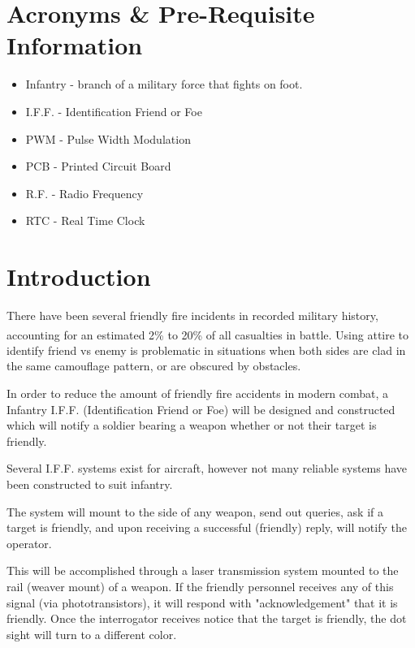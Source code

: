 \documentclass[openbib,letterpaper,10pt]{article}
\newcommand{\buildtoc}{
	\clearpage
	\singlespacing
	\tableofcontents
	\onehalfspacing
}
\begin{document}
\maketitle
\pagestyle{fancy}
\begin{spacing}{1.15}


\color{black}
\buildtoc
{}
\section*{Acronyms \& Pre-Requisite Information}
\begin{itemize}
	\item Infantry - branch of a military force that fights on foot.
	\item I.F.F. - Identification Friend or Foe
	\item PWM - Pulse Width Modulation
	\item PCB - Printed Circuit Board
	\item R.F. - Radio Frequency
	\item RTC - Real Time Clock
\end{itemize}
\clearpage
\setcounter{page}{1}

\section{Introduction}
There have been several friendly fire incidents in recorded military history, accounting for an estimated 2\% to 20\% of all casualties in battle\textsuperscript{\cite{USArmy}}. Using attire to identify friend vs enemy is problematic in situations when both sides are clad in the same camouflage pattern, or are obscured by obstacles.

In order to reduce the amount of friendly fire accidents in modern combat, a Infantry I.F.F. (Identification Friend or Foe) will be designed and constructed which will notify a soldier bearing a weapon whether or not their target is friendly.

Several I.F.F. systems exist for aircraft, however not many reliable systems have been constructed to suit infantry.

The system will mount to the side of any weapon, send out queries, ask if a target is friendly, and upon receiving a successful (friendly) reply, will notify the operator.

This will be accomplished through a laser transmission system mounted to the rail (weaver mount) of a weapon. If the friendly personnel receives any of this signal (via phototransistors), it will respond with "acknowledgement" that it is friendly. Once the interrogator receives notice that the target is friendly, the dot sight will turn to a different color.


\end{spacing}
\end{document}

